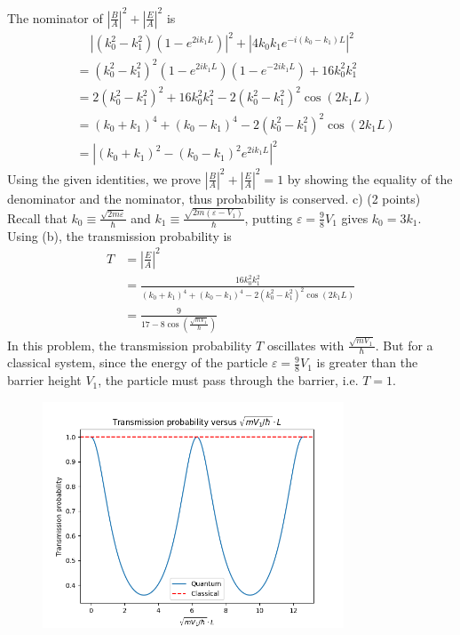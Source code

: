 \documentclass[12pt]{book} %
\numberwithin{equation}{chapter}
\def\e{\varepsilon}
\begin{document}
\begin{solbox}
\noindent The nominator of $\left|\frac{B}{A}\right|^{2}+\left|\frac{E}{A}\right|^{2}$ is
\begin{align*}
&\,\,\,\,\,\,\,\left|\left(k_{0}^{2}-k_{1}^{2}\right)\left(1-e^{2ik_{1}L}\right)\right|^{2}+\left|4k_{0}k_{1}e^{-i\left(k_{0}-k_{1}\right)L}\right|^{2}\\
&=\left(k_{0}^{2}-k_{1}^{2}\right)^{2}\left(1-e^{2ik_{1}L}\right)\left(1-e^{-2ik_{1}L}\right)+16k_{0}^{2}k_{1}^{2}\\
&=2\left(k_{0}^{2}-k_{1}^{2}\right)^{2}+16k_{0}^{2}k_{1}^{2}-2\left(k_{0}^{2}-k_{1}^{2}\right)^{2}\cos\left(2k_{1}L\right)\\
&=\left(k_{0}+k_{1}\right)^{4}+\left(k_{0}-k_{1}\right)^{4}-2\left(k_{0}^{2}-k_{1}^{2}\right)^{2}\cos\left(2k_{1}L\right)\\
&=\left|\left(k_{0}+k_{1}\right)^{2}-\left(k_{0}-k_{1}\right)^{2}e^{2ik_{1}L}\right|^{2}
\end{align*}
Using the given identities, we prove $\left|\frac{B}{A}\right|^{2}+\left|\frac{E}{A}\right|^{2}=1$ by showing the equality of the denominator and the nominator, thus probability is conserved.\bigskip\newline
c) (2 points)\\
Recall that $k_{0}\equiv\frac{\sqrt{2m\e}}{\hbar}$ and $k_{1}\equiv\frac{\sqrt{2m\left(\e-V_{1}\right)}}{\hbar}$, putting $\e=\frac{9}{8}V_{1}$ gives $k_{0}=3k_{1}$.\bigskip\newline
Using (b), the transmission probability is
\begin{align*}
T&=\left|\frac{E}{A}\right|^{2}\\
&=\frac{16k_{0}^{2}k_{1}^{2}}{\left(k_{0}+k_{1}\right)^{4}+\left(k_{0}-k_{1}\right)^{4}-2\left(k_{0}^{2}-k_{1}^{2}\right)^{2}\cos\left(2k_{1}L\right)}\\
&=\frac{9}{17-8\cos\left(\frac{\sqrt{mV_{1}}}{\hbar}\right)}
\end{align*}
In this problem, the transmission probability $T$ oscillates with $\frac{\sqrt{mV_{1}}}{\hbar}$. But for a classical system, since the energy of the particle $\e=\frac{9}{8}V_{1}$ is greater than the barrier height $V_{1}$, the particle must pass through the barrier, i.e. $T=1$.
\begin{figure}[H]
\centering
\includegraphics[width=0.8\textwidth]{A finite potential barrier T}
\end{figure}
\end{solbox}
\end{document}
